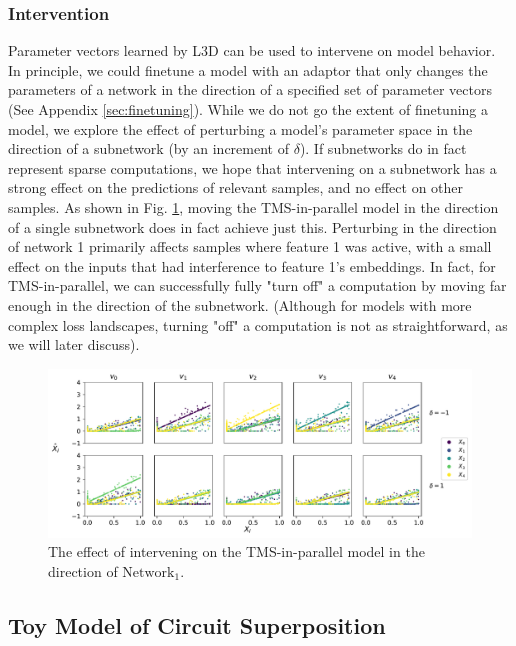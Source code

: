 \documentclass{article}
\theoremstyle{plain}
\theoremstyle{definition}
\theoremstyle{remark}
\begin{document}
\subsubsection{Intervention}

Parameter vectors learned by L3D can be used to intervene on model behavior. In principle, we could finetune a model with an adaptor that only changes the parameters of a network in the direction of a specified set of parameter vectors (See Appendix \ref{sec:finetuning}). While we do not go the extent of finetuning a model, we explore the effect of perturbing a model's parameter space in the direction of a subnetwork (by an increment of $\delta$). If subnetworks do in fact represent sparse computations, we hope that intervening on a subnetwork has a strong effect on the predictions of relevant samples, and no effect on other samples. As shown in Fig. \ref{fig:4_tms_intervention}, moving the TMS-in-parallel model in the direction of a single subnetwork does in fact achieve just this. Perturbing in the direction of network 1 primarily affects samples where feature 1 was active, with a small effect on the inputs that had interference to feature 1's embeddings. In fact, for TMS-in-parallel, we can successfully fully "turn off" a computation by moving far enough in the direction of the subnetwork. (Although for models with more complex loss landscapes, turning "off" a computation is not as straightforward, as we will later discuss).

\begin{figure}
    \centerline{\includegraphics[width=\columnwidth]{../figures/4_tms_intervention.pdf}}
    \centering
    \caption{The effect of intervening on the TMS-in-parallel model in the direction of $\text{Network}_1$.}\label{fig:4_tms_intervention}
\end{figure}

\subsection{Toy Model of Circuit Superposition}
\end{document}
